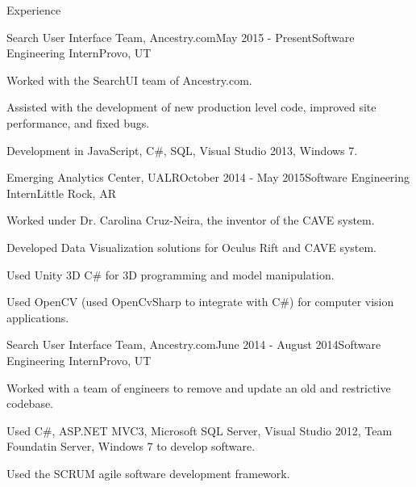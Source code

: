 \documentclass{resume} %
\begin{document}
\begin{rSection}{Experience}

\begin{rSubsection}{Search User Interface Team, Ancestry.com}{May 2015 - Present}{Software Engineering Intern}{Provo, UT}

	\item Worked with the SearchUI team of Ancestry.com.
	\item Assisted with the development of new production level code, improved site performance, and fixed bugs.
	\item Development in JavaScript, C\#, SQL, Visual Studio 2013, Windows 7.
\end{rSubsection}

\begin{rSubsection}{Emerging Analytics Center, UALR}{October 2014 - May 2015}{Software Engineering Intern}{Little Rock, AR}

	\item Worked under Dr. Carolina Cruz-Neira, the inventor of the CAVE system.
	\item Developed Data Visualization solutions for Oculus Rift and CAVE system.
	\item Used Unity 3D C\# for 3D programming and model manipulation.
	\item Used OpenCV (used OpenCvSharp to integrate with C\#) for computer vision applications.
\end{rSubsection}

\begin{rSubsection}{Search User Interface Team, Ancestry.com}{June 2014 - August 2014}{Software Engineering Intern}{Provo, UT}

    \item Worked with a team of engineers to remove and update an old and restrictive codebase.
    \item Used C\#, ASP.NET MVC3, Microsoft SQL Server, Visual Studio 2012, Team Foundatin Server, Windows 7 to develop software.
	\item Used the SCRUM agile software development framework.
\end{rSubsection}

\end{rSection}
\end{document}
